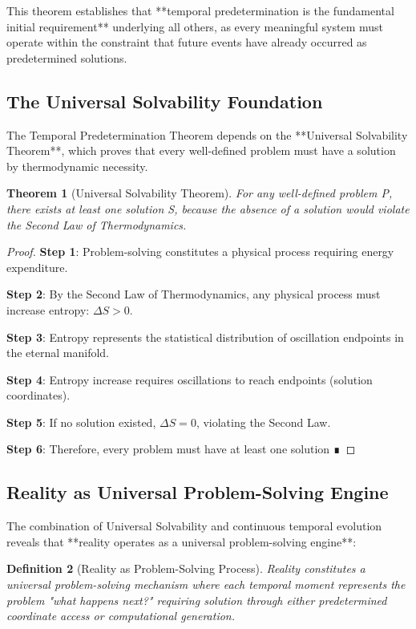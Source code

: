 \documentclass[12pt,a4paper]{article}
\newtheorem{theorem}{Theorem}[section]
\newtheorem{definition}[theorem]{Definition}
\begin{document}
This theorem establishes that **temporal predetermination is the fundamental initial requirement** underlying all others, as every meaningful system must operate within the constraint that future events have already occurred as predetermined solutions.

\subsection{The Universal Solvability Foundation}

The Temporal Predetermination Theorem depends on the **Universal Solvability Theorem**, which proves that every well-defined problem must have a solution by thermodynamic necessity.

\begin{theorem}[Universal Solvability Theorem]
For any well-defined problem P, there exists at least one solution S, because the absence of a solution would violate the Second Law of Thermodynamics.
\end{theorem}

\begin{proof}
\textbf{Step 1}: Problem-solving constitutes a physical process requiring energy expenditure.

\textbf{Step 2}: By the Second Law of Thermodynamics, any physical process must increase entropy: $\Delta S > 0$.

\textbf{Step 3}: Entropy represents the statistical distribution of oscillation endpoints in the eternal manifold.

\textbf{Step 4}: Entropy increase requires oscillations to reach endpoints (solution coordinates).

\textbf{Step 5}: If no solution existed, $\Delta S = 0$, violating the Second Law.

\textbf{Step 6}: Therefore, every problem must have at least one solution ∎
\end{proof}

\subsection{Reality as Universal Problem-Solving Engine}

The combination of Universal Solvability and continuous temporal evolution reveals that **reality operates as a universal problem-solving engine**:

\begin{definition}[Reality as Problem-Solving Process]
Reality constitutes a universal problem-solving mechanism where each temporal moment represents the problem "what happens next?" requiring solution through either predetermined coordinate access or computational generation.
\end{definition}
\end{document}
